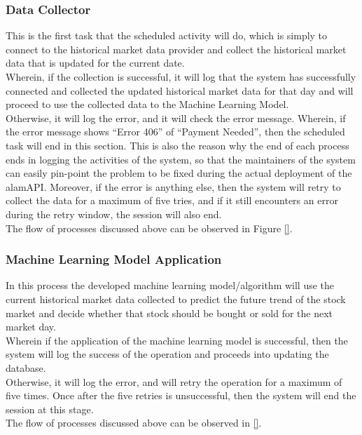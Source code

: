 \subsubsection{Data Collector}
\label{subsubsec:data_ollector}
This is the first task that the scheduled 
activity will do, which is simply to connect to the historical market 
data provider and collect the historical market data that is updated for 
the current date.
\vspace{0.5cm}
\\Wherein, if the collection is successful, it will log that 
the system has successfully connected and collected the updated 
historical market data for that day and will proceed to use the 
collected data to the Machine Learning Model.
\vspace{0.5cm}
\\Otherwise, it will log the error, and it will check the error message. 
Wherein, if the error message shows “Error 406” of “Payment Needed”, 
then the scheduled task will end in this section. This is also the reason why 
the end of each process ends in logging the activities of the system, so that 
the maintainers of the system can easily pin-point the problem to be fixed during 
the actual deployment of the alamAPI. Moreover, if the error is anything else, 
then the system will retry to collect the data for a maximum of five tries, and 
if it still encounters an error during the retry window, the session will also end.
\vspace{0.5cm}
\\The flow of processes discussed above can be observed in Figure \ref{}.
\subsubsection{Machine Learning Model Application}
\label{subsubsec:ml_application}
In this process the developed machine learning model/algorithm will use the 
current historical market data collected to predict the future trend of the 
stock market and decide whether that stock should be bought or sold for 
the next market day.
\vspace{0.5cm}
\\Wherein if the application of the machine learning model is successful, 
then the system will log the success of the operation and proceeds into 
updating the database.
\vspace{0.5cm}
\\Otherwise, it will log the error, and will retry the operation for a 
maximum of five times. Once after the five retries is unsuccessful, 
then the system will end the session at this stage.
\vspace{0.5cm}
\\The flow of processes discussed above can be 
observed in \ref{}.

